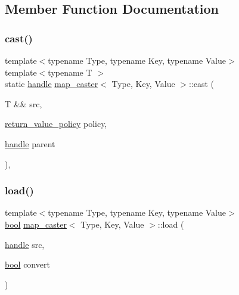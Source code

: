 \subsection{Member Function Documentation}
\mbox{\label{structmap__caster_a445ec6f48f16736f1076420f79f19e92}} 
\subsubsection{\texorpdfstring{cast()}{cast()}}
{\footnotesize\ttfamily template$<$typename Type, typename Key, typename Value$>$ \\
template$<$typename T $>$ \\
static \mbox{\hyperlink{classhandle}{handle}} \mbox{\hyperlink{structmap__caster}{map\+\_\+caster}}$<$ Type, Key, Value $>$\+::cast (\begin{DoxyParamCaption}\item[{T \&\&}]{src,  }\item[{\mbox{\hyperlink{detail_2common_8h_adde72ab1fb0dd4b48a5232c349a53841}{return\+\_\+value\+\_\+policy}}}]{policy,  }\item[{\mbox{\hyperlink{classhandle}{handle}}}]{parent }\end{DoxyParamCaption})\hspace{0.3cm}{\ttfamily [inline]}, {\ttfamily [static]}}

\mbox{\label{structmap__caster_aa35d07c2fcaf64c021da0bff1f710992}} 
\subsubsection{\texorpdfstring{load()}{load()}}
{\footnotesize\ttfamily template$<$typename Type, typename Key, typename Value$>$ \\
\mbox{\hyperlink{asdl_8h_af6a258d8f3ee5206d682d799316314b1}{bool}} \mbox{\hyperlink{structmap__caster}{map\+\_\+caster}}$<$ Type, Key, Value $>$\+::load (\begin{DoxyParamCaption}\item[{\mbox{\hyperlink{classhandle}{handle}}}]{src,  }\item[{\mbox{\hyperlink{asdl_8h_af6a258d8f3ee5206d682d799316314b1}{bool}}}]{convert }\end{DoxyParamCaption})\hspace{0.3cm}{\ttfamily [inline]}}

